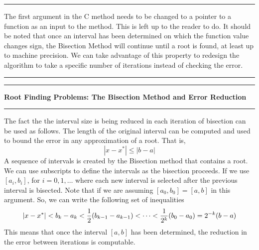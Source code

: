 \documentclass[10pt,fleqn]{article}
\begin{document}
\vskip0.1in\hrule\vskip0.1in
\noindent
The first argument in the C method needs to be changed to a pointer to a
function as an input to the method. This is left up to the reader to do.
It should be noted that once an interval has been determined on which the
function value changes sign, the Bisection Method will continue until a root is
found, at least up to machine precision. We can take advantage of this property
to redesign the algorithm to take a specific number of iterations instead of
checking the error.
\vskip0.1in\hrule\vskip0.1in
\newpage
\vskip0.1in\hrule\vskip0.1in
\noindent
{\bf Root Finding Problems: The Bisection Method and Error Reduction}
\vskip0.1in\hrule\vskip0.1in
\noindent
The fact the the interval size is being reduced in each iteration of bisection
can be used as follows. The length of the original interval can be computed and
used to bound the error in any approximation of a root. That is,
$$
  | x - x^* | \leq | b - a |
$$
A sequence of intervals is created by the Bisection method that contains a root.
We can use subscripts to define the intervals as the bisection proceeds. If we
use $[a_i, b_i]$, for $i=0,1,\ldots$ where each new interval is selected after
the previous interval is bisected. Note that if we are assuming
$[a_0, b_0]=[a,b]$ in this argument. So, we can write the following set of
inequalities
$$
  | x - x^* | < b_k - a_k
              < {1\over 2} ( b_{k-1} - a_{k-1} )
              < \cdots
              < {1\over{2^k}} ( b_0 - a_0 ) = 2^{-k} ( b - a )  
$$ 
This means that once the interval $[a, b]$ has been determined, the reduction in
the error between iterations is computable.
\end{document}
